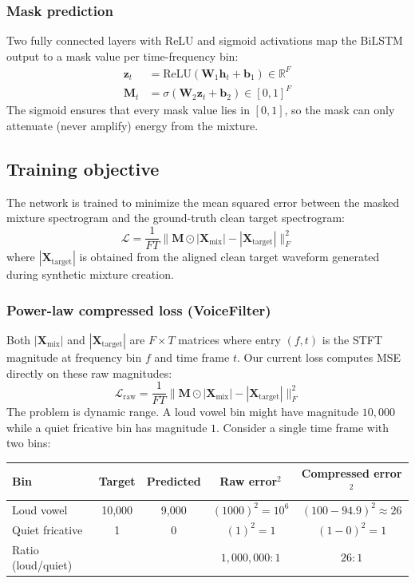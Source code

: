 \documentclass{article}
\begin{document}
\subsubsection{Mask prediction}
Two fully connected layers with ReLU and sigmoid activations map the BiLSTM output to a mask value per time-frequency bin:
\begin{align}
    \mathbf{z}_t &= \text{ReLU}(\mathbf{W}_1 \mathbf{h}_t + \mathbf{b}_1) \in \mathbb{R}^{F} \\
    \mathbf{M}_t &= \sigma(\mathbf{W}_2 \mathbf{z}_t + \mathbf{b}_2) \in [0,1]^{F}
\end{align}
The sigmoid ensures that every mask value lies in $[0,1]$, so the mask can only attenuate (never amplify) energy from the mixture.

\subsection{Training objective}

The network is trained to minimize the mean squared error between the masked mixture spectrogram and the ground-truth clean target spectrogram:
\[
    \mathcal{L} = \frac{1}{FT} \bigl\| \mathbf{M} \odot |\mathbf{X}_{\text{mix}}| - |\mathbf{X}_{\text{target}}| \bigr\|_F^2
\]
where $|\mathbf{X}_{\text{target}}|$ is obtained from the aligned clean target waveform generated during synthetic mixture creation.

\subsubsection{Power-law compressed loss (VoiceFilter)}

Both $|\mathbf{X}_{\text{mix}}|$ and $|\mathbf{X}_{\text{target}}|$ are $F \times T$ matrices where entry $(f,t)$ is the STFT magnitude at frequency bin $f$ and time frame $t$. Our current loss computes MSE directly on these raw magnitudes:
\[
    \mathcal{L}_{\text{raw}} = \frac{1}{FT} \bigl\| \mathbf{M} \odot |\mathbf{X}_{\text{mix}}| - |\mathbf{X}_{\text{target}}| \bigr\|_F^2
\]
The problem is dynamic range. A loud vowel bin might have magnitude $10{,}000$ while a quiet fricative bin has magnitude $1$. Consider a single time frame with two bins:

\begin{table}[H]
\centering
\small
\begin{tabular}{@{}lcccc@{}}
\toprule
\textbf{Bin} & \textbf{Target} & \textbf{Predicted} & \textbf{Raw error$^2$} & \textbf{Compressed error$^2$} \\
\midrule
Loud vowel     & 10{,}000 & 9{,}000 & $(1000)^2 = 10^6$ & $(100 - 94.9)^2 \approx 26$ \\
Quiet fricative & 1       & 0       & $(1)^2 = 1$         & $(1 - 0)^2 = 1$              \\
\midrule
Ratio (loud/quiet) & & & $1{,}000{,}000 : 1$ & $26 : 1$ \\
\bottomrule
\end{tabular}
\end{table}
\end{document}
